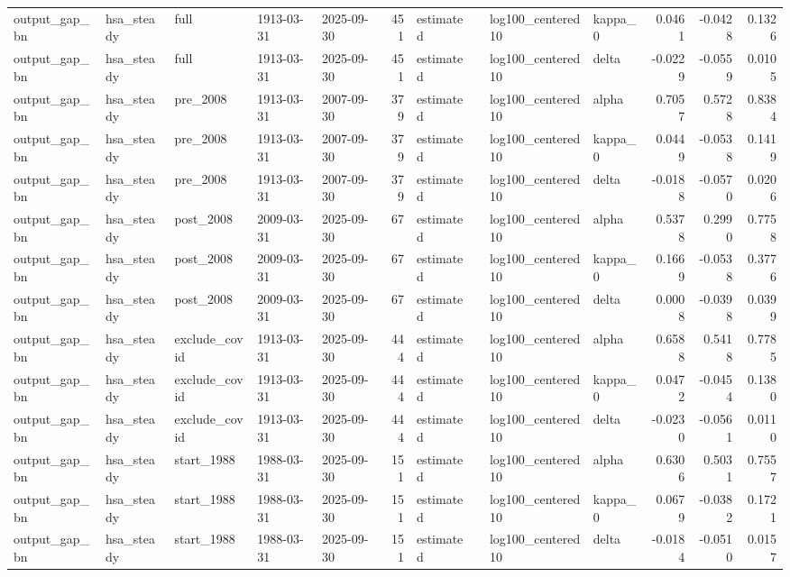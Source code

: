 \begin{tabular}{lllllrllllrrr}
output\_gap\_bn & hsa\_steady & full & 1913-03-31 & 2025-09-30 & 451 & estimated &  & log100\_centered10 & kappa\_0 & 0.0461 & -0.0428 & 0.1326 \\
output\_gap\_bn & hsa\_steady & full & 1913-03-31 & 2025-09-30 & 451 & estimated &  & log100\_centered10 & delta & -0.0229 & -0.0559 & 0.0105 \\
output\_gap\_bn & hsa\_steady & pre\_2008 & 1913-03-31 & 2007-09-30 & 379 & estimated &  & log100\_centered10 & alpha & 0.7057 & 0.5728 & 0.8384 \\
output\_gap\_bn & hsa\_steady & pre\_2008 & 1913-03-31 & 2007-09-30 & 379 & estimated &  & log100\_centered10 & kappa\_0 & 0.0449 & -0.0538 & 0.1419 \\
output\_gap\_bn & hsa\_steady & pre\_2008 & 1913-03-31 & 2007-09-30 & 379 & estimated &  & log100\_centered10 & delta & -0.0188 & -0.0570 & 0.0206 \\
output\_gap\_bn & hsa\_steady & post\_2008 & 2009-03-31 & 2025-09-30 & 67 & estimated &  & log100\_centered10 & alpha & 0.5378 & 0.2990 & 0.7758 \\
output\_gap\_bn & hsa\_steady & post\_2008 & 2009-03-31 & 2025-09-30 & 67 & estimated &  & log100\_centered10 & kappa\_0 & 0.1669 & -0.0538 & 0.3776 \\
output\_gap\_bn & hsa\_steady & post\_2008 & 2009-03-31 & 2025-09-30 & 67 & estimated &  & log100\_centered10 & delta & 0.0008 & -0.0398 & 0.0399 \\
output\_gap\_bn & hsa\_steady & exclude\_covid & 1913-03-31 & 2025-09-30 & 444 & estimated &  & log100\_centered10 & alpha & 0.6588 & 0.5418 & 0.7785 \\
output\_gap\_bn & hsa\_steady & exclude\_covid & 1913-03-31 & 2025-09-30 & 444 & estimated &  & log100\_centered10 & kappa\_0 & 0.0472 & -0.0454 & 0.1380 \\
output\_gap\_bn & hsa\_steady & exclude\_covid & 1913-03-31 & 2025-09-30 & 444 & estimated &  & log100\_centered10 & delta & -0.0230 & -0.0561 & 0.0110 \\
output\_gap\_bn & hsa\_steady & start\_1988 & 1988-03-31 & 2025-09-30 & 151 & estimated &  & log100\_centered10 & alpha & 0.6306 & 0.5031 & 0.7557 \\
output\_gap\_bn & hsa\_steady & start\_1988 & 1988-03-31 & 2025-09-30 & 151 & estimated &  & log100\_centered10 & kappa\_0 & 0.0679 & -0.0382 & 0.1721 \\
output\_gap\_bn & hsa\_steady & start\_1988 & 1988-03-31 & 2025-09-30 & 151 & estimated &  & log100\_centered10 & delta & -0.0184 & -0.0510 & 0.0157 \\

\end{tabular}
